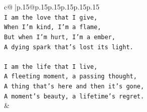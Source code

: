 \documentclass{article}
\begin{document}
{\begin{supertabular}{c@{$\;$}|p{.15\linewidth}@{}p{.15\linewidth}p{.15\linewidth}p{.15\linewidth}p{.15\linewidth}p{.15\linewidth}}
{{{\\ 
\texttt{I am the love that I give, } \\
\texttt{When I'm kind, I'm a flame, } \\
\texttt{But when I'm hurt, I'm a ember, } \\
\texttt{A dying spark that's lost its light.} \\
\\ 
\texttt{I am the life that I live, } \\
\texttt{A fleeting moment, a passing thought, } \\
\texttt{A thing that's here and then it's gone, } \\
\texttt{A moment's beauty, a lifetime's regret.} \\
            }
        }
    }
    & \\ \\


\end{supertabular}}
\end{document}
